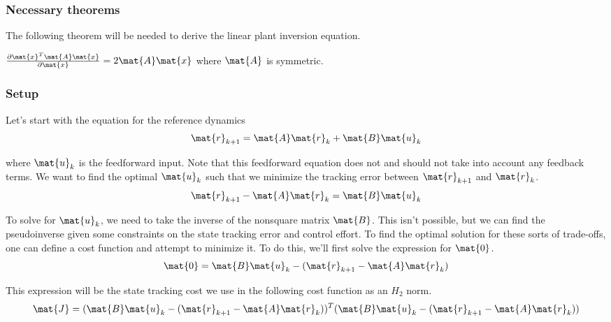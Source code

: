 \subsubsection{Necessary theorems}

The following theorem will be needed to derive the linear plant inversion
equation.
\begin{theorem}
  \label{thm:partial_xax}

  $\frac{\partial \mat{x}^T\mat{A}\mat{x}}{\partial\mat{x}} =
    2\mat{A}\mat{x}$ where $\mat{A}$ is symmetric.
\end{theorem}

\subsubsection{Setup}

Let's start with the equation for the \gls{reference} dynamics
\begin{equation*}
  \mat{r}_{k+1} = \mat{A}\mat{r}_k + \mat{B}\mat{u}_k
\end{equation*}

where $\mat{u}_k$ is the feedforward input. Note that this feedforward equation
does not and should not take into account any feedback terms. We want to find
the optimal $\mat{u}_k$ such that we minimize the \gls{tracking} error between
$\mat{r}_{k+1}$ and $\mat{r}_k$.
\begin{equation*}
  \mat{r}_{k+1} - \mat{A}\mat{r}_k = \mat{B}\mat{u}_k
\end{equation*}

To solve for $\mat{u}_k$, we need to take the inverse of the nonsquare matrix
$\mat{B}$. This isn't possible, but we can find the pseudoinverse given some
constraints on the \gls{state} \gls{tracking} error and \gls{control effort}. To
find the optimal solution for these sorts of trade-offs, one can define a cost
function and attempt to minimize it. To do this, we'll first solve the
expression for $\mat{0}$.
\begin{equation*}
  \mat{0} = \mat{B}\mat{u}_k - (\mat{r}_{k+1} - \mat{A}\mat{r}_k)
\end{equation*}

This expression will be the \gls{state} \gls{tracking} cost we use in the
following cost function as an $H_2$ norm.
\begin{equation*}
  \mat{J} = (\mat{B}\mat{u}_k - (\mat{r}_{k+1} - \mat{A}\mat{r}_k))^T
    (\mat{B}\mat{u}_k - (\mat{r}_{k+1} - \mat{A}\mat{r}_k))
\end{equation*}

